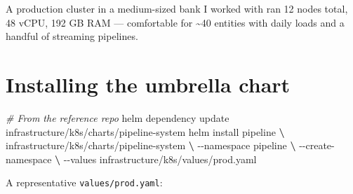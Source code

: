 \documentclass[
  11pt,
  british,
  oneside]{book}
\newenvironment{Shaded}{\begin{snugshade}}{\end{snugshade}}
\newcommand{\CommentTok}[1]{\textcolor[rgb]{0.56,0.35,0.01}{\textit{#1}}}
\newcommand{\ExtensionTok}[1]{#1}
\newcommand{\KeywordTok}[1]{\textcolor[rgb]{0.13,0.29,0.53}{\textbf{#1}}}
\newcommand{\NormalTok}[1]{#1}
\begin{document}
A production cluster in a medium-sized bank I worked with ran 12 nodes
total, 48 vCPU, 192 GB RAM --- comfortable for \textasciitilde40
entities with daily loads and a handful of streaming pipelines.

\hypertarget{installing-the-umbrella-chart}{%
\section{Installing the umbrella
chart}\label{installing-the-umbrella-chart}}

\begin{Shaded}
\begin{Highlighting}[]
\CommentTok{\# From the reference repo}
\ExtensionTok{helm}\NormalTok{ dependency update infrastructure/k8s/charts/pipeline{-}system}
\ExtensionTok{helm}\NormalTok{ install pipeline }\KeywordTok{\textbackslash{}}
  \ExtensionTok{infrastructure/k8s/charts/pipeline{-}system} \KeywordTok{\textbackslash{}}
  \ExtensionTok{{-}{-}namespace}\NormalTok{ pipeline }\KeywordTok{\textbackslash{}}
  \ExtensionTok{{-}{-}create{-}namespace} \KeywordTok{\textbackslash{}}
  \ExtensionTok{{-}{-}values}\NormalTok{ infrastructure/k8s/values/prod.yaml}
\end{Highlighting}
\end{Shaded}

A representative \texttt{values/prod.yaml}:
\end{document}
